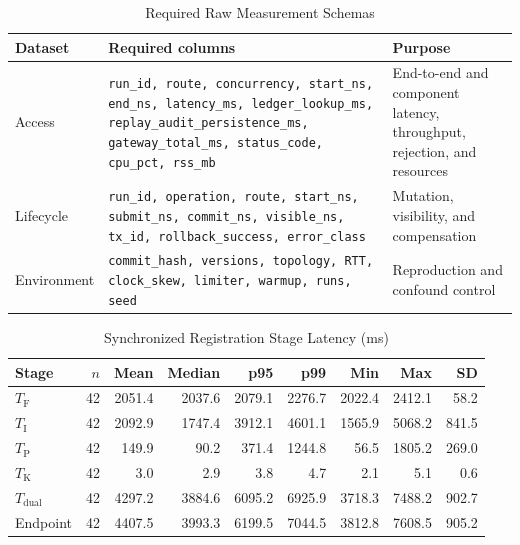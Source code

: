 \begin{table}[t]
\caption{Required Raw Measurement Schemas}
\label{tab:schemas}
\centering
\scriptsize
\begin{tabularx}{\textwidth}{@{}l X X@{}}
\toprule
Dataset & Required columns & Purpose \\
\midrule
Access & \texttt{run\_id, route, concurrency, start\_ns, end\_ns, latency\_ms, ledger\_lookup\_ms, replay\_audit\_persistence\_ms, gateway\_total\_ms, status\_code, cpu\_pct, rss\_mb} & End-to-end and component latency, throughput, rejection, and resources \\
Lifecycle & \texttt{run\_id, operation, route, start\_ns, submit\_ns, commit\_ns, visible\_ns, tx\_id, rollback\_success, error\_class} & Mutation, visibility, and compensation \\
Environment & \texttt{commit\_hash, versions, topology, RTT, clock\_skew, limiter, warmup, runs, seed} & Reproduction and confound control \\
\bottomrule
\end{tabularx}
\end{table}

\begin{table}[t]
\caption{Synchronized Registration Stage Latency (ms)}
\label{tab:synchronized-latency}
\centering
\scriptsize
\setlength{\tabcolsep}{2.4pt}
\begin{tabular}{@{}lrrrrrrrr@{}}
\toprule
Stage & $n$ & Mean & Median & p95 & p99 & Min & Max & SD \\
\midrule
$T_{\mathrm{F}}$ & 42 & 2051.4 & 2037.6 & 2079.1 & 2276.7 & 2022.4 & 2412.1 & 58.2 \\
$T_{\mathrm{I}}$ & 42 & 2092.9 & 1747.4 & 3912.1 & 4601.1 & 1565.9 & 5068.2 & 841.5 \\
$T_{\mathrm{P}}$ & 42 & 149.9 & 90.2 & 371.4 & 1244.8 & 56.5 & 1805.2 & 269.0 \\
$T_{\mathrm{K}}$ & 42 & 3.0 & 2.9 & 3.8 & 4.7 & 2.1 & 5.1 & 0.6 \\
$T_{\mathrm{dual}}$ & 42 & 4297.2 & 3884.6 & 6095.2 & 6925.9 & 3718.3 & 7488.2 & 902.7 \\
Endpoint & 42 & 4407.5 & 3993.3 & 6199.5 & 7044.5 & 3812.8 & 7608.5 & 905.2 \\
\bottomrule
\end{tabular}
\end{table}

